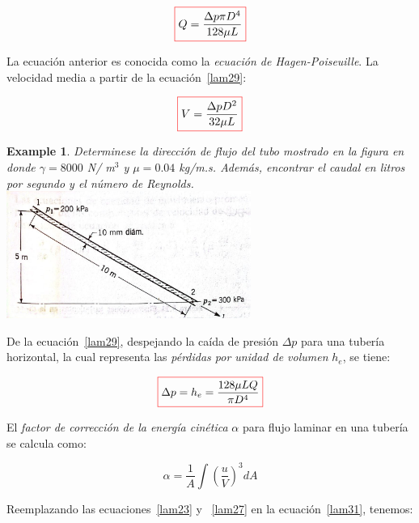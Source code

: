 \documentclass[11pt, oneside]{article}
\newtheorem{exa}{Example}
\begin{document}
\begin{equation}
\color{red}\boxed{\color{black} Q = \frac{\Delta p \pi D^4}{128 \mu L} }
\label{lam29}
\end{equation}

La ecuaci\'on anterior es conocida como la \emph{ecuaci\'on de Hagen-Poiseuille}. La velocidad media a partir de la ecuaci\'on~\ref{lam29}:

\begin{equation}
\color{red}\boxed{\color{black} V = \frac{\Delta p D^2}{32 \mu L} }
\label{lam30}
\end{equation}

\begin{shaded}
\begin{exa}
Determinese la direcci\'on de flujo del tubo mostrado en la figura en donde $\gamma = 8000$ N/ m$^3$ y $\mu = 0.04$ kg/m.s. Adem\'as, encontrar el caudal en litros por segundo y el n\'umero de Reynolds.
\includegraphics[width=8cm]{exa1.jpeg}
\end{exa}
\end{shaded}

De la ecuaci\'on~\ref{lam29}, despejando la ca\'ida de presi\'on $\Delta p$ para una tuber\'ia horizontal, la cual representa las \emph{p\'erdidas por unidad de volumen} $h_e$, se tiene:

\begin{equation}
\color{red}\boxed{\color{black} \Delta p = h_e = \frac{128 \mu LQ}{\pi D^4} }
\label{lam311}
\end{equation}

El \emph{factor de correcci\'on de la energ\'ia cin\'etica} $\alpha$ para flujo laminar en una tuber\'ia se calcula como:

\begin{equation}
\alpha = \frac{1}{A} \int \left ( \frac{u}{V} \right )^3 dA
\label{lam31}
\end{equation}

Reemplazando las ecuaciones~\ref{lam23} y ~\ref{lam27} en la ecuaci\'on~\ref{lam31}, tenemos:
\end{document}
